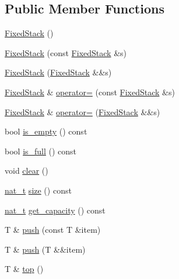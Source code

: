 \subsection*{Public Member Functions}
\begin{DoxyCompactItemize}
\item 
\hyperlink{class_designar_1_1_fixed_stack_a0c590a0c0a634d22c71234023f85dc2e}{Fixed\+Stack} ()
\item 
\hyperlink{class_designar_1_1_fixed_stack_a07e80411f9dbbc5009846ffd9f614b3c}{Fixed\+Stack} (const \hyperlink{class_designar_1_1_fixed_stack}{Fixed\+Stack} \&s)
\item 
\hyperlink{class_designar_1_1_fixed_stack_aa2a2a6d0c92619bc8404c6c0fd5962c7}{Fixed\+Stack} (\hyperlink{class_designar_1_1_fixed_stack}{Fixed\+Stack} \&\&s)
\item 
\hyperlink{class_designar_1_1_fixed_stack}{Fixed\+Stack} \& \hyperlink{class_designar_1_1_fixed_stack_a3176c9be0f7199ed6708b3e0aca9d8a5}{operator=} (const \hyperlink{class_designar_1_1_fixed_stack}{Fixed\+Stack} \&s)
\item 
\hyperlink{class_designar_1_1_fixed_stack}{Fixed\+Stack} \& \hyperlink{class_designar_1_1_fixed_stack_a300a79d1d3821297d058228cb69f2747}{operator=} (\hyperlink{class_designar_1_1_fixed_stack}{Fixed\+Stack} \&\&s)
\item 
bool \hyperlink{class_designar_1_1_fixed_stack_a59e1c93e8653984ac828840111914982}{is\+\_\+empty} () const
\item 
bool \hyperlink{class_designar_1_1_fixed_stack_ab008ea6214d2335d4fd1ac18fa05e0f1}{is\+\_\+full} () const
\item 
void \hyperlink{class_designar_1_1_fixed_stack_a63b4e0110ee9590eba7b2e776159eb17}{clear} ()
\item 
\hyperlink{namespace_designar_aa72662848b9f4815e7bf31a7cf3e33d1}{nat\+\_\+t} \hyperlink{class_designar_1_1_fixed_stack_a89fc7e6df53ecefa9197a63aeb17e1d0}{size} () const
\item 
\hyperlink{namespace_designar_aa72662848b9f4815e7bf31a7cf3e33d1}{nat\+\_\+t} \hyperlink{class_designar_1_1_fixed_stack_a617775aac061d6a003c7e1638e3e82bb}{get\+\_\+capacity} () const
\item 
T \& \hyperlink{class_designar_1_1_fixed_stack_a2c6786c06798604aaa851e0589c7ba75}{push} (const T \&item)
\item 
T \& \hyperlink{class_designar_1_1_fixed_stack_ac41dfc3fd83bc3b0176e37dcfd600f70}{push} (T \&\&item)
\item 
T \& \hyperlink{class_designar_1_1_fixed_stack_ad9ee2070f73351b57f5cb7de74ab6aa7}{top} ()

\end{DoxyCompactItemize}
